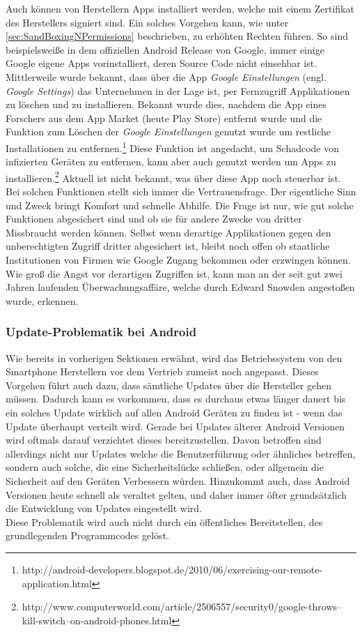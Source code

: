 Auch können von Herstellern Apps installiert werden, welche mit einem Zertifikat des Herstellers signiert sind. Ein solches Vorgehen kann, wie unter \ref*{sec:SandBoxingNPermissions} beschrieben, zu erhöhten Rechten führen.
So sind beispielsweiße in dem offiziellen Android Release von Google, immer einige Google eigene Apps vorinstalliert, deren Source Code nicht einsehbar ist. Mittlerweile wurde bekannt, dass über die App \textit{Google Einstellungen} (engl. \textit{Google Settings}) das Unternehmen in der Lage ist, per Fernzugriff Applikationen zu löschen und zu installieren. Bekannt wurde dies, nachdem die App eines Forschers aus dem App Market (heute Play Store) entfernt wurde und die Funktion zum Löschen der \textit{Google Einstellungen} genutzt wurde um restliche Installationen zu entfernen.\footnote{http://android-developers.blogspot.de/2010/06/exercising-our-remote-application.html} 
Diese Funktion ist angedacht, um Schadcode von infizierten Geräten zu entfernen, kann aber auch genutzt werden um Apps zu installieren.\footnote{http://www.computerworld.com/article/2506557/security0/google-throws--kill-switch--on-android-phones.html} Aktuell ist nicht bekannt, was über diese App noch steuerbar ist.\\
Bei solchen Funktionen stellt sich immer die Vertrauensfrage. Der eigentliche Sinn und Zweck bringt Komfort und schnelle Abhilfe. Die Frage ist nur, wie gut solche Funktionen abgesichert sind und ob sie für andere Zwecke von dritter Missbraucht werden können. Selbst wenn derartige Applikationen gegen den unberechtigten Zugriff dritter abgesichert ist, bleibt noch offen ob staatliche Institutionen von Firmen wie Google Zugang bekommen oder erzwingen können. Wie groß die Angst vor derartigen Zugriffen ist, kann man an der seit gut zwei Jahren laufenden Überwachungsaffäre, welche durch Edward Snowden angestoßen wurde, erkennen.

\subsubsection{Update-Problematik bei Android}
Wie bereits in vorherigen Sektionen erwähnt, wird das Betriebssystem von den Smartphone Herstellern vor dem Vertrieb zumeist noch angepasst. Dieses Vorgehen führt auch dazu, dass sämtliche Updates über die Hersteller gehen müssen. Dadurch kann es vorkommen, dass es durchaus etwas länger dauert bis ein solches Update wirklich auf allen Android Geräten zu finden ist - wenn das Update überhaupt verteilt wird. Gerade bei Updates älterer Android Versionen wird oftmals darauf verzichtet dieses bereitzustellen. Davon betroffen sind allerdings nicht nur Updates welche die Benutzerführung oder ähnliches betreffen, sondern auch solche, die eine Sicherheitslücke schließen, oder allgemein die Sicherheit auf den Geräten Verbessern würden. Hinzukommt auch, dass Android Versionen heute schnell als veraltet gelten, und daher immer öfter grundsätzlich die Entwicklung von Updates eingestellt wird.\cite{Drake2014}\\
Diese Problematik wird auch nicht durch ein öffentliches Bereitstellen, des grundlegenden Programmcodes gelöst.

